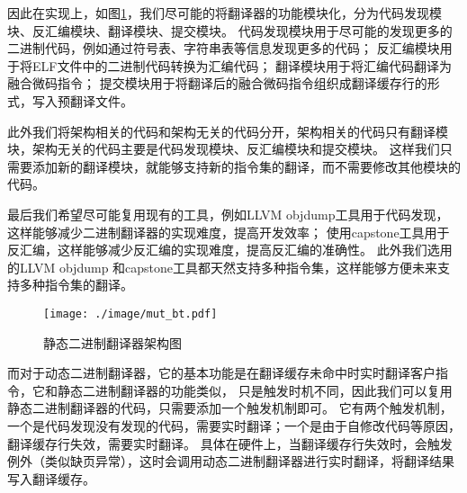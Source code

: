 因此在实现上，如图\ref{img:mut_bt}，我们尽可能的将翻译器的功能模块化，分为代码发现模块、反汇编模块、翻译模块、提交模块。
代码发现模块用于尽可能的发现更多的二进制代码，例如通过符号表、字符串表等信息发现更多的代码；
反汇编模块用于将ELF文件中的二进制代码转换为汇编代码；
翻译模块用于将汇编代码翻译为融合微码指令；
提交模块用于将翻译后的融合微码指令组织成翻译缓存行的形式，写入预翻译文件。

此外我们将架构相关的代码和架构无关的代码分开，架构相关的代码只有翻译模块，架构无关的代码主要是代码发现模块、反汇编模块和提交模块。
这样我们只需要添加新的翻译模块，就能够支持新的指令集的翻译，而不需要修改其他模块的代码。

最后我们希望尽可能复用现有的工具，例如LLVM objdump工具用于代码发现，这样能够减少二进制翻译器的实现难度，提高开发效率；
使用capstone工具用于反汇编，这样能够减少反汇编的实现难度，提高反汇编的准确性。
此外我们选用的LLVM objdump 和capstone工具都天然支持多种指令集，这样能够方便未来支持多种指令集的翻译。



\begin{figure}[h]
  \centering
  \texttt{[image: ./image/mut\_bt.pdf]}
  \caption{静态二进制翻译器架构图}
  \label{img:mut_bt}
\end{figure}

而对于动态二进制翻译器，它的基本功能是在翻译缓存未命中时实时翻译客户指令，它和静态二进制翻译器的功能类似，
只是触发时机不同，因此我们可以复用静态二进制翻译器的代码，只需要添加一个触发机制即可。
它有两个触发机制，一个是代码发现没有发现的代码，需要实时翻译；一个是由于自修改代码等原因，翻译缓存行失效，需要实时翻译。
具体在硬件上，当翻译缓存行失效时，会触发例外（类似缺页异常），这时会调用动态二进制翻译器进行实时翻译，将翻译结果写入翻译缓存。